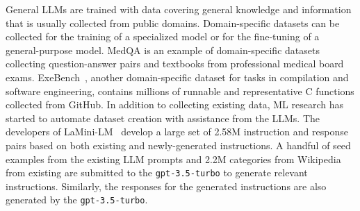 
General LLMs are trained with data covering general knowledge and information that is usually collected from public domains. 
Domain-specific datasets can be collected for the training of a specialized model or for the fine-tuning of a general-purpose model.
MedQA\cite{jin2020disease} is an example of domain-specific datasets collecting question-answer pairs and textbooks  from professional medical board exams.
ExeBench~\cite{exebench}, another domain-specific dataset for tasks in compilation and software engineering, contains millions of runnable and representative C functions collected from GitHub.
In addition to collecting existing data, ML research has started to automate dataset creation with assistance from the LLMs.  
The developers of LaMini-LM~\cite{wu2023lamini} develop a large set of 2.58M instruction and response pairs based on both existing and newly-generated instructions.  A handful of seed examples from the existing LLM prompts and 2.2M categories from Wikipedia from existing  are submitted to the \texttt{gpt-3.5-turbo} to generate relevant instructions.  Similarly, the responses for the generated instructions are also generated by the \texttt{gpt-3.5-turbo}.


